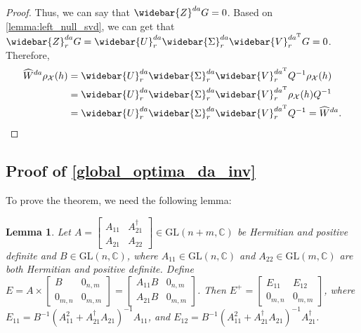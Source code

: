 \documentclass{article}
\newcommand{\T}{\mathrm{T}}
\theoremstyle{plain}
\newtheorem{lemma}[theorem]{Lemma}
\theoremstyle{definition}
\theoremstyle{remark}
\theoremstyle{remark}
\begin{document}
\begin{proof}
      Thus, we can say that $\widebar{Z}^{da} G = 0$. Based on \autoref{lemma:left_null_svd}, we can get that $\widebar{Z}_r^{da} G = \widebar{U}_r^{da} \widebar{\Sigma}_r^{da} {\widebar{V}_r^{da^{\T}}} G = 0$. Therefore, 
      \begin{align}
        \widehat{W}^{da} \rho_{\mathcal{X}}(h) &= \widebar{U}_r^{da} \widebar{\Sigma}_r^{da} {\widebar{V}_r^{da^{\T}}} Q^{-1} \rho_{\mathcal{X}}(h) \nonumber \\
        &= \widebar{U}_r^{da} \widebar{\Sigma}_r^{da} {\widebar{V}_r^{da^{\T}}}\rho_{\mathcal{X}}(h) Q^{-1} \nonumber \\
        &= \widebar{U}_r^{da} \widebar{\Sigma}_r^{da} {\widebar{V}_r^{da^{\T}}} Q^{-1} = \widehat{W}^{da}.
      \end{align}
    \end{proof}


\subsection{Proof of \autoref{global_optima_da_inv}}
  To prove the theorem, we need the following lemma:
  \begin{lemma} \label{lemma:pseudoinverse_product}
    Let $A = \begin{bmatrix} A_{11} & A_{21}^{\dagger} \\ A_{21} & A_{22} \end{bmatrix} \in \mathrm{GL}(n+m, \mathbb{C})$ be Hermitian and positive definite and $B \in \mathrm{GL}(n, \mathbb{C})$, where $A_{11} \in \mathrm{GL}(n, \mathbb{C})$ and $A_{22} \in \mathrm{GL}(m, \mathbb{C})$ are both Hermitian and positive definite. Define $E = A \times \begin{bmatrix} B & 0_{n,m} \\ 0_{m,n} & 0_{m,m} \end{bmatrix} = \begin{bmatrix} A_{11} B & 0_{n,m} \\ A_{21} B & 0_{m,m} \end{bmatrix}$. Then $E^{+} = \begin{bmatrix} E_{11} & E_{12} \\ 0_{m,n} & 0_{m,m} \end{bmatrix}$, where $E_{11} = B^{-1} \left(A_{11}^2 + A_{21}^{\dagger}A_{21}\right)^{-1} A_{11}$, and $E_{12} = B^{-1} \left(A_{11}^2 + A_{21}^{\dagger}A_{21}\right)^{-1} A_{21}^{\dagger}$.
  \end{lemma}
\end{document}
